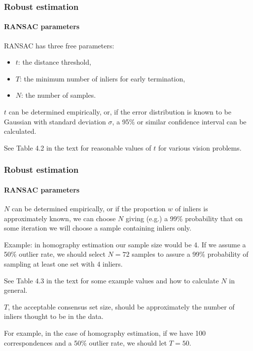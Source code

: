 \documentclass[aspectratio=169]{beamer}
\begin{document}
\begin{frame}
\frametitle{Robust estimation}
\framesubtitle{RANSAC parameters}

RANSAC has three \alert{free parameters}:
\begin{itemize}
\item $t$: the \alert{distance threshold},
\item $T$: the \alert{minimum number of inliers} for early termination,
\item $N$: the \alert{number of samples}.
\end{itemize}

\medskip

$t$ can be determined empirically, or, if the \alert{error
  distribution} is \alert{known} to be Gaussian with standard
deviation $\sigma$, a 95\% or similar confidence interval can be
calculated.

\medskip

See Table 4.2 in the text for reasonable values of $t$ for various
vision problems.

\end{frame}

\begin{frame}
\frametitle{Robust estimation}
\framesubtitle{RANSAC parameters}

$N$ can be determined empirically, or if the proportion $w$ of inliers
is approximately known, we can choose $N$ giving (e.g.) a 99\%
probability that \alert{on some iteration} we will choose a sample
containing \alert{inliers only}.

\medskip

Example: in homography estimation our sample size would be 4.  If we
assume a 50\% outlier rate, we should select $N=72$ samples to assure
a 99\% probability of sampling at least one set with 4 inliers.

\medskip

See Table 4.3 in the text for some example values and how to calculate
$N$ in general.

\medskip

$T$, the acceptable consensus set size, should be approximately the
\alert{number of inliers} thought to be in the data.

\medskip

For example, in the case of homography estimation, if we have 100
correspondences and a 50\% outlier rate, we should let $T=50$.

\end{frame}
\end{document}
